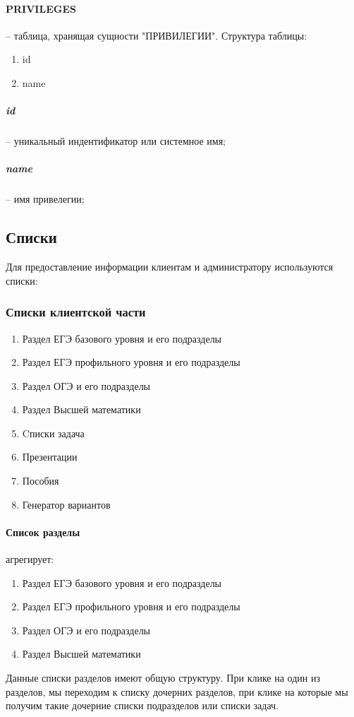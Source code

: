 \paragraph{PRIVILEGES} -- таблица, хранящая сущности "ПРИВИЛЕГИИ". Структура таблицы:
\begin{enumerate}
  \item id
  \item name
\end{enumerate}
\subparagraph{id} --  уникальный индентификатор или системное имя;
\subparagraph{name} -- имя привелегии;

\subsection{Списки}
Для предоставление информации клиентам и администратору используются списки:
\subsubsection{Списки клиентской части}
\begin{enumerate}
  \item Раздел ЕГЭ базового уровня и его подразделы
  \item Раздел ЕГЭ профильного уровня и его подразделы
  \item Раздел ОГЭ и его подразделы
  \item Раздел Высшей математики
  \item Cписки задача
  \item Презентации
  \item Пособия
  \item Генератор вариантов
\end{enumerate}

\paragraph{Список разделы} агрегирует:
\begin{enumerate}
  \item Раздел ЕГЭ базового уровня и его подразделы
  \item Раздел ЕГЭ профильного уровня и его подразделы
  \item Раздел ОГЭ и его подразделы
  \item Раздел Высшей математики
\end{enumerate}
Данные списки разделов имеют общую структуру. При клике на один из разделов, мы переходим к списку дочерних разделов, при клике на которые мы получим такие дочерние списки подразделов или списки задач.

